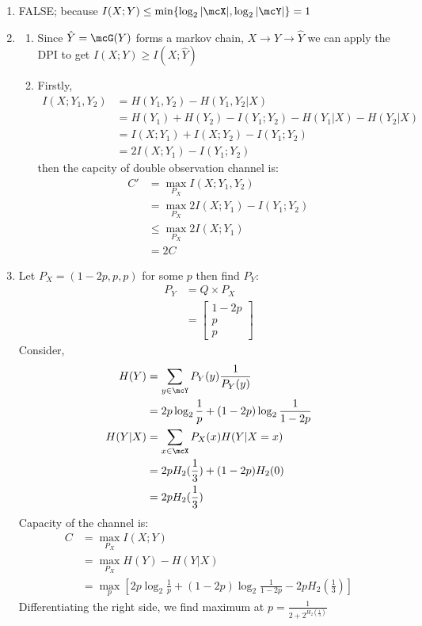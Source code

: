\documentclass[12pt, a4paper]{article}
\begin{document}
\begin{enumerate}
  \item FALSE; because $I(X;Y) \leq \min\{\log_2|\mcX|, \log_2|\mcY|\} = 1$

  \item 
    \begin{enumerate}
      \item Since $\hat{Y}= \mcG(Y)$ forms a markov chain, $X \to Y \to \hat{Y}$ we can apply the DPI to get $I(X;Y) \geq I(X;\hat{Y})$ 

      \item Firstly, 
        \begin{align*}
          I(X;Y_1,Y_2) &= H(Y_1,Y_2) - H(Y_1,Y_2|X)\\ 
                       &= H(Y_1) + H(Y_2) - I(Y_1;Y_2) - H(Y_1|X) - H(Y_2|X)\\ 
                       &= I(X;Y_1) + I(X;Y_2) - I(Y_1;Y_2)\\ 
                       &= 2I(X;Y_1)-I(Y_1;Y_2)
        \end{align*}
        then the capcity of double observation channel is:
        \begin{align*}
          C' &= \max_{P_X}I(X;Y_1,Y_2)\\
             &= \max_{P_X}2I(X;Y_1) - I(Y_1;Y_2)\\ 
             &\leq \max_{P_X}2I(X;Y_1)\\ 
             &= 2C
        \end{align*}
    \end{enumerate}

  \pagebreak
  \item Let $P_X = (1-2p, p, p)$ for some $p$ then find $P_Y$:
    \begin{align*}
      P_Y &= Q \times P_X\\ 
          &= \begin{bmatrix} 1-2p\\p\\p \end{bmatrix}
    \end{align*}
    Consider,
    \begin{align*}
      H(Y) &= \sum_{y\in\mcY} P_Y(y)\frac{1}{P_Y(y)}\\ 
           &= 2p\log_2 \frac{1}{p} + (1-2p)\log_2 \frac{1}{1-2p}\\ 
      H(Y|X) &= \sum_{x\in\mcX}P_X(x)H(Y|X=x)\\ 
             &= 2pH_2(\frac{1}{3}) + (1-2p)H_2(0)\\ 
             &= 2pH_2(\frac{1}{3})
    \end{align*}
    Capacity of the channel is:
    \begin{align*}
      C &= \max_{P_X}I(X;Y)\\
        &= \max_{P_X}H(Y) - H(Y|X)\\ 
        &= \max_p \left[2p\log_2 \frac{1}{p} + (1-2p)\log_2 \frac{1}{1-2p} -2pH_2(\frac{1}{3})\right]
    \end{align*}
    Differentiating the right side, we find maximum at $p=\frac{1}{2 + 2^{H_2(\frac{1}{3})}}$

\end{enumerate}
\end{document}
